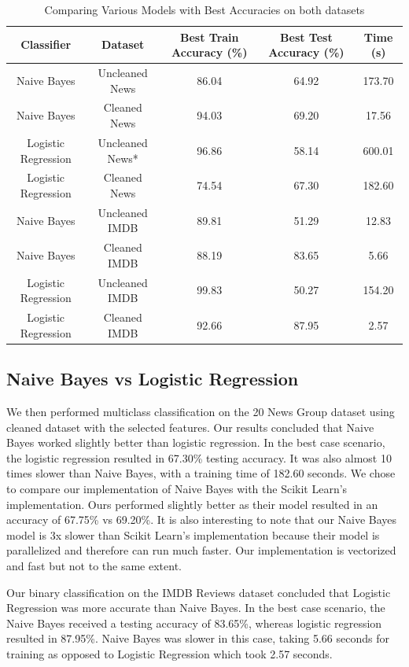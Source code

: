 \documentclass[11pt]{homework}
\begin{document}
\begin{table}[h!] 
\centering
\begin{tabular}{||c c c c c||} 
\hline
 Classifier & Dataset & Best Train Accuracy (\%) & Best Test Accuracy (\%) & Time (s)\\ [0.5ex]
 \hline\hline
 Naive Bayes & Uncleaned News & 86.04 & 64.92 & 173.70 \\ 
 Naive Bayes & Cleaned News & 94.03 & 69.20 & 17.56 \\ 
 Logistic Regression & Uncleaned News* &  96.86 & 58.14 & 600.01  \\
 Logistic Regression & Cleaned News & 74.54 & 67.30 & 182.60 \\
 \hline \hline
 Naive Bayes & Uncleaned IMDB & 89.81 & 51.29 & 12.83 \\ 
 Naive Bayes & Cleaned IMDB & 88.19 & 83.65 & 5.66 \\ 
 Logistic Regression & Uncleaned IMDB & 99.83 & 50.27 & 154.20 \\
 Logistic Regression & Cleaned IMDB & 92.66 & 87.95 & 2.57  \\[1ex] 
 \hline
\end{tabular}
\caption{Comparing Various Models with Best Accuracies on both datasets}
\label{table-cleaned-vs-uncleaned}
\end{table}

\subsection{Naive Bayes vs Logistic Regression}
We then performed multiclass classification on the 20 News Group dataset using cleaned dataset with the selected features. Our results concluded that Naive Bayes worked slightly better than logistic regression. In the best case scenario, the logistic regression resulted in 67.30\% testing accuracy. It was also almost 10 times slower than Naive Bayes, with a training time of 182.60 seconds. We chose to compare our implementation of Naive Bayes with the Scikit Learn's implementation. Ours performed slightly better as their model resulted in an accuracy of 67.75\% vs 69.20\%. It is also interesting to note that our Naive Bayes model is 3x slower than Scikit Learn's implementation because their model is parallelized and therefore can run much faster. Our implementation is vectorized and fast but not to the same extent.

Our binary classification on the IMDB Reviews dataset concluded that Logistic Regression was more accurate than Naive Bayes. In the best case scenario, the Naive Bayes received a testing accuracy of 83.65\%, whereas logistic regression resulted in 87.95\%. Naive Bayes was slower in this case, taking 5.66 seconds for training as opposed to Logistic Regression which took 2.57 seconds.
\end{document}
